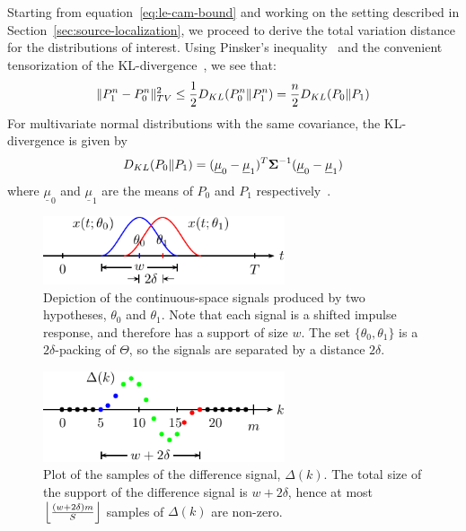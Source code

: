 \documentclass[conference]{IEEEtran}
\providecommand{\v}{}
\renewcommand{\v}[1]{\underline{#1}}
\providecommand{\m}{}
\renewcommand{\m}[1]{{\bf #1}}
\DeclarePairedDelimiter\norm{\lVert}{\rVert}
\DeclarePairedDelimiter\floor{\lfloor}{\rfloor}
\begin{document}
\begin{IEEEproof}
Starting from equation~\eqref{eq:le-cam-bound} and working on the setting
described in Section~\ref{sec:source-localization}, we proceed to derive the
total variation distance for the distributions of interest. Using Pinsker's
inequality~\cite{Kullback1967Lower} and the convenient tensorization of the
KL-divergence~\cite{Duchi2015Information}, we see that:
\begin{equation} \label{eq:pinsker-tensorization}
	\norm{P_1^n - P_0^n}_{TV}^2 \leq \frac{1}{2} D_{KL}(P_0^n \Vert P_1^n) = \frac{n}{2} D_{KL}(P_0 \Vert P_1)
\end{equation}
For multivariate normal distributions with the same covariance, the
KL-divergence is given by
\begin{equation} \label{eq:kl-div-normal}
	D_{KL}(P_0 \Vert P_1) = (\v \mu_0 - \v \mu_1)^T \m \Sigma^{-1} (\v \mu_0 - \v \mu_1)
\end{equation}
where $\v \mu_0$ and $\v \mu_1$ are the means of $P_0$ and $P_1$
respectively~\cite{DuchiDerivation}.

\begin{figure}[t]
	\centering
	\includegraphics[width=2.8in]{overlap-middle-pics}
	\caption{Depiction of the continuous-space signals produced by two
		hypotheses, $\theta_0$ and $\theta_1$. Note that each signal is a
		shifted impulse response, and therefore has a support of size $w$.
		The set $\{\theta_0, \theta_1\}$ is a $2\delta$-packing of
		$\Theta$, so the signals are separated by a distance $2\delta$.}
	\label{fig:overlap-middle}
\end{figure}

\begin{figure}[t]
	\centering
	\includegraphics[width=2.8in]{delta-sampled-pics}
	\caption{Plot of the samples of the difference signal, $\Delta(k)$. The
		total size of the support of the difference signal is $w+2\delta$,
		hence at most $\floor*{\frac{(w + 2\delta)m}{S}}$ samples of
		$\Delta(k)$ are non-zero.}
	\label{fig:delta-sampled}
\end{figure}


\end{IEEEproof}
\end{document}
